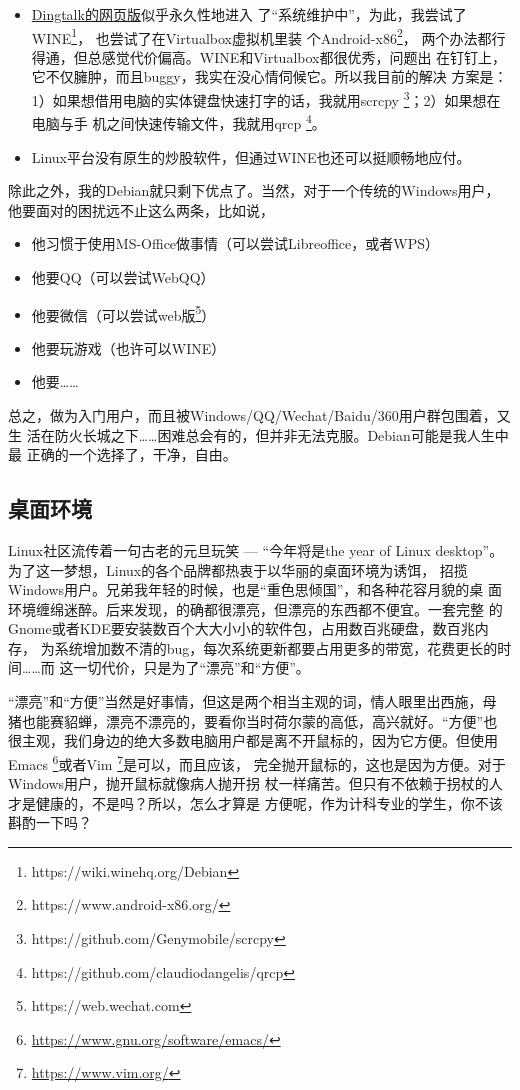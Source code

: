 \begin{itemize}
\item \href{https://im.dingtalk.com}{Dingtalk的网页版}似乎永久性地进入
  了“系统维护中”，为此，我尝试了WINE\footnote{https://wiki.winehq.org/Debian}，%
  也尝试了在Virtualbox虚拟机里装
  个Android-x86\footnote{https://www.android-x86.org/}，%
  两个办法都行得通，但总感觉代价偏高。WINE和Virtualbox都很优秀，问题出
  在钉钉上，它不仅臃肿，而且buggy，我实在没心情伺候它。所以我目前的解决
  方案是：1）如果想借用电脑的实体键盘快速打字的话，我就用scrcpy%
  \footnote{https://github.com/Genymobile/scrcpy}；2）如果想在电脑与手
  机之间快速传输文件，我就用qrcp%
  \footnote{https://github.com/claudiodangelis/qrcp}。
\item Linux平台没有原生的炒股软件，但通过WINE也还可以挺顺畅地应付。
\end{itemize}

除此之外，我的Debian就只剩下优点了。当然，对于一个传统的Windows用户，
他要面对的困扰远不止这么两条，比如说，

\begin{itemize}
\item 他习惯于使用MS-Office做事情（可以尝试Libreoffice，或者WPS）
\item 他要QQ（可以尝试WebQQ）
\item 他要微信（可以尝试web版\footnote{https://web.wechat.com}）
\item 他要玩游戏（也许可以WINE）
\item 他要……
\end{itemize}

总之，做为入门用户，而且被Windows/QQ/Wechat/Baidu/360用户群包围着，又生
活在防火长城之下……困难总会有的，但并非无法克服。Debian可能是我人生中最
正确的一个选择了，干净，自由。

\subsection{桌面环境}

Linux社区流传着一句古老的元旦玩笑 --- “今年将是the year of Linux
desktop”。为了这一梦想，Linux的各个品牌都热衷于以华丽的桌面环境为诱饵，
招揽Windows用户。兄弟我年轻的时候，也是“重色思倾国”，和各种花容月貌的桌
面环境缠绵迷醉。后来发现，的确都很漂亮，但漂亮的东西都不便宜。一套完整
的Gnome或者KDE要安装数百个大大小小的软件包，占用数百兆硬盘，数百兆内存，
为系统增加数不清的bug，每次系统更新都要占用更多的带宽，花费更长的时间……而
这一切代价，只是为了“漂亮”和“方便”。

“漂亮”和“方便”当然是好事情，但这是两个相当主观的词，情人眼里出西施，母
猪也能赛貂蝉，漂亮不漂亮的，要看你当时荷尔蒙的高低，高兴就好。“方便”也
很主观，我们身边的绝大多数电脑用户都是离不开鼠标的，因为它方便。但使用Emacs%
\footnote{\url{https://www.gnu.org/software/emacs/}}或者Vim%
\footnote{\url{https://www.vim.org/}}是可以，而且应该，%
完全抛开鼠标的，这也是因为方便。对于Windows用户，抛开鼠标就像病人抛开拐
杖一样痛苦。但只有不依赖于拐杖的人才是健康的，不是吗？所以，怎么才算是
方便呢，作为计科专业的学生，你不该斟酌一下吗？

